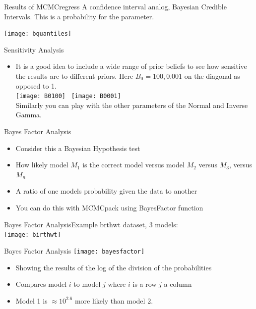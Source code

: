\documentclass[table]{beamer}
\begin{document}
\begin{frame}{Results of MCMCregress}
	A confidence interval analog, Bayesian Credible Intervals. This is a probability for the parameter.
	\begin{center}
		\texttt{[image: bquantiles]}
	\end{center}
\end{frame}

\begin{frame}{Sensitivity Analysis}
	\begin{itemize}
		\item It is a good idea to include a wide range of prior beliefs to see how sensitive the results are to different priors. Here $ B_0 = 100, 0.001$ on the diagonal as opposed to 1.\\
		\texttt{[image: B0100]} \ \texttt{[image: B0001]} \\
		Similarly you can play with the other parameters of the Normal and Inverse Gamma. 
	\end{itemize}
\end{frame}

\begin{frame}{Bayes Factor Analysis}
	\begin{itemize}
		\item Consider this a Bayesian Hypothesis test
		\item How likely model $ M_1 $ is the correct model versus model $ M_2 $ versus $ M_3 $, versus $ M_n $
		\item A ratio of one models probability given the data to another
		\item You can do this with MCMCpack using BayesFactor function
	\end{itemize}
\end{frame}

\begin{frame}{Bayes Factor Analysis}{Example}
	brthwt dataset, 3 models:\\
	\texttt{[image: birthwt]}
\end{frame}

\begin{frame}{Bayes Factor Analysis}
	\texttt{[image: bayesfactor]}
	\begin{itemize}
		\item Showing the results of the log of the division of the probabilities
		\item Compares model $ i $ to model $ j $ where $ i $ is a row $ j $ a column
		\item Model 1 is $ \approx 10^{2.6} $ more likely than model 2.
	\end{itemize}
\end{frame}
\end{document}
